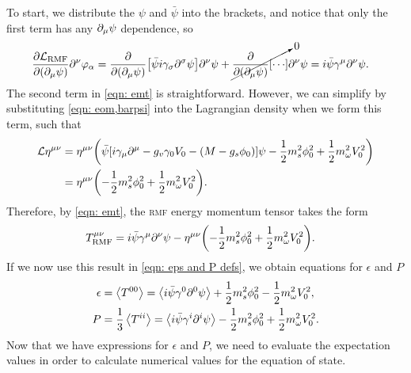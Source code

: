 To start, we distribute the $\psi$ and $\bar\psi$ into the brackets, and notice that only the first term has any $\partial_\mu \psi$ dependence, so
\begin{align}
    \pdv{\Lag_\text{RMF}}{(\p_\mu \psi)} \p^\nu \varphi_\alpha & = \pdv{(\p_\mu \psi)}\bqty{\bar\psi i \gamma_\sigma \p^\sigma\psi}\p^\nu \psi + \cancelto{0}{\pdv{(\p_\mu \psi)}\bqty{\cdots}} \p^\nu \psi = i\bar\psi\gamma^\mu \p^\nu \psi.
\end{align}
The second term in \eqref{eqn: emt} is straightforward. However, we can simplify by substituting \ref{eqn: eom,barpsi} into the Lagrangian density when we form this term, such that
\begin{align}
    \Lag \eta^{\mu\nu} &= \eta^{\mu\nu}\pqty{\bar\psi \bqty{i\gamma_\mu\p^\mu - g_v \gamma_0 V_0 - (M-g_s\phi_0)} \psi - \frac{1}{2} m_s^2 \phi_0^2 + \frac{1}{2} m_\omega^2 V_0^2}\nonumber\\
    & = \eta^{\mu\nu} \pqty{- \frac{1}{2} m_s^2 \phi_0^2 + \frac{1}{2} m_\omega^2 V_0^2}.
\end{align}
Therefore, by \eqref{eqn: emt}, the \textsc{rmf} energy momentum tensor takes the form
\begin{align}
    T^{\mu\nu}_\text{RMF} & =i\bar\psi\gamma^\mu \p^\nu \psi - \eta^{\mu\nu} \pqty{- \frac{1}{2} m_s^2 \phi_0^2 + \frac{1}{2} m_\omega^2 V_0^2}.
\end{align}
If we now use this result in \eqref{eqn: eps and P defs}, we obtain equations for $\epsilon$ and $P$
\begin{align}
    \epsilon & = \expval{T^{00}} = \expval{i\bar\psi\gamma^0 \partial^0 \psi} + \frac{1}{2} m_s^2 \phi_0^2 - \frac{1}{2} m_\omega^2 V_0^2,\\
    P &= \frac{1}{3}\expval{T^{ii}} = \expval{i\bar\psi\gamma^i \partial^i \psi}  - \frac{1}{2} m_s^2 \phi_0^2 + \frac{1}{2} m_\omega^2 V_0^2.
\end{align}
Now that we have expressions for $\epsilon$ and $P$, we need to evaluate the expectation values in order to calculate numerical values for the equation of state.


\medskip
{}
\medskip


